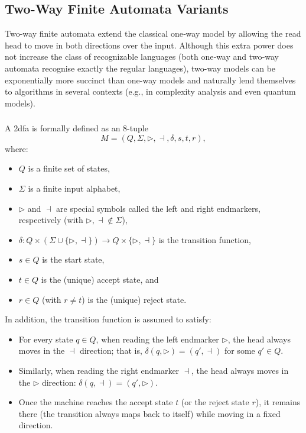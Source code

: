 \subsection{Two-Way Finite Automata Variants}
\label{subsec:two-way-variants}

Two-way finite automata extend the classical one‐way model by allowing the read head to move in both directions over the input. Although this extra power does not increase the class of recognizable languages (both one‐way and two‐way automata recognise exactly the regular languages), two-way models can be exponentially more succinct than one-way models \cite{sakoda1978nfas, kozen1997automata} and naturally lend themselves to algorithms in several contexts (e.g., in complexity analysis and even quantum models).


\subsubsection{}
\label{subsubsec:2dfa}

\begin{definition}
A \gls{2dfa} is formally defined as an 8-tuple 
\[
M = (Q, \Sigma, \triangleright, \dashv, \delta, s, t, r),
\]
where:
\begin{itemize}
  \item \(Q\) is a finite set of states,
  \item \(\Sigma\) is a finite input alphabet,
  \item \(\triangleright\) and \(\dashv\) are special symbols called the left and right endmarkers, respectively (with \(\triangleright,\dashv \notin \Sigma\)),
  \item \(\delta: Q \times (\Sigma \cup \{\triangleright, \dashv\}) \to Q \times \{\triangleright,\dashv\}\) is the transition function,
  \item \(s\in Q\) is the start state,
  \item \(t\in Q\) is the (unique) accept state, and
  \item \(r\in Q\) (with \(r\neq t\)) is the (unique) reject state.
\end{itemize}
In addition, the transition function is assumed to satisfy:
\begin{itemize}
  \item For every state \(q\in Q\), when reading the left endmarker \(\triangleright\), the head always moves in the \(\dashv\) direction; that is, \(\delta(q,\triangleright) = (q', \dashv)\) for some \(q'\in Q\).
  \item Similarly, when reading the right endmarker \(\dashv\), the head always moves in the \(\triangleright\) direction: \(\delta(q,\dashv) = (q', \triangleright)\).
  \item Once the machine reaches the accept state \(t\) (or the reject state \(r\)), it remains there (the transition always maps back to itself) while moving in a fixed direction.
\end{itemize}
\end{definition}

